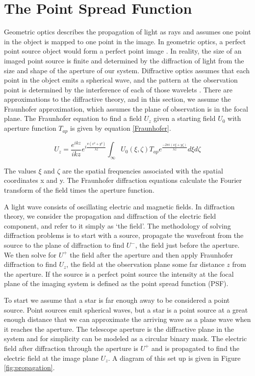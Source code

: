 \section{The Point Spread Function}

 Geometric optics describes the propagation of light as rays and assumes one point in the object is mapped to one point in the image. In geometric optics, a perfect point source object would form a perfect point image \citep{hecht2002optics}. In reality, the size of an imaged point source is finite and determined by the diffraction of light from the size and shape of the aperture of our system. Diffractive optics assumes that each point in the object emits a spherical wave, and the pattern at the observation point is determined by the interference of each of those wavelets \citep{goodman2005introduction}. There are approximations to the diffractive theory, and in this section, we assume the Fraunhofer approximation, which assumes the plane of observation is in the focal plane. The Fraunhofer equation to find a field $U_z$ given a starting field $U_0$ with aperture function $T_{ap}$ is given by equation \ref{Fraunhofer}.

\begin{equation}
U_z=\frac{e^{ikz}}{ikz}e^{i\frac{\pi (x^2+y^2)}{\lambda z}}\int_{\infty} U_0(\xi,\zeta)T_{ap}e^{\frac{-2\pi i(x\xi+y\zeta)}{\lambda z}}d\xi d\zeta
\label{Fraunhofer}
\end{equation}

The values $\xi$ and $\zeta$ are the spatial frequencies associated with the spatial coordinates x and y. The Fraunhofer diffraction equations calculate the Fourier transform of the field times the aperture function.

A light wave consists of oscillating electric and magnetic fields. In diffraction theory, we consider the propagation and diffraction of the electric field component, and refer to it simply as `the field'. The methodology of solving diffraction problems is to start with a source, propagate the wavefront from the source to the plane of diffraction to find $U^-$, the field just before the aperture. We then solve for $U^+$ the field after the aperture and then apply Fraunhofer diffraction to find $U_z$, the field at the observation plane some far distance $z$ from the aperture. If the source is a perfect point source the intensity at the focal plane of the imaging system is defined as the point spread function (PSF).

To start we assume that a star is far enough away to be considered a point source. Point sources emit spherical waves, but a star is a point source at a great enough distance that we can approximate the arriving wave as a plane wave when it reaches the aperture. The telescope aperture is the diffractive plane in the system and for simplicity can be modeled as a circular binary mask. The electric field after diffraction through the aperture is $U^+$ and is propagated to find the electric field at the image plane $U_z$. A diagram of this set up is given in Figure \ref{fig:propagation}. 

